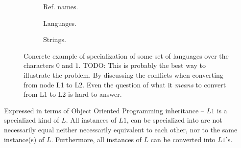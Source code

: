 \documentclass{scrreprt}
\begin{document}
\begin{figure}[h]
\centering

  \begin{subfigure}{.33\textwidth}
    \centering


    \caption{Ref. names.}
    \label{fig:fictive-specialization-tree-example-ref}
  \end{subfigure}%
  \begin{subfigure}{.33\textwidth}
    \centering

    \caption{Languages.}
    \label{fig:fictive-specialization-tree-example-languages}

  \end{subfigure}%
  \begin{subfigure}{.33\textwidth}
    \centering


    \caption{Strings.}
    \label{fig:fictive-specialization-tree-example-run}
  \end{subfigure}

  \caption{Concrete example of specialization of some set of languages over the characters $0$ and $1$. TODO: This is probably the best way to illustrate the problem. By discussing the conflicts when converting from node L1 to L2. Even the question of what it \emph{means} to convert from L1 to L2 is hard to answer.}
  \label{fig:fictive-specialization-tree-example}
\end{figure}

Expressed in terms of Object Oriented Programming inheritance -- $L1$ is a specialized kind of $L$. All instances of $L1$, can be specialized into are not necessarily equal  neither necessarily equivalent to each other, nor to the same instance(s) of $L$. Furthermore, all instances of $L$ can be converted into $L1$'s.
\end{document}
